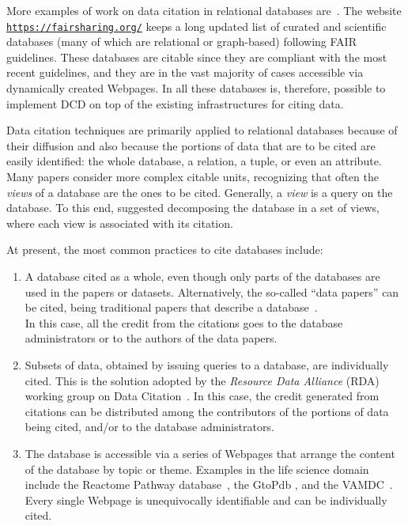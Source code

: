 More examples of work on data citation in relational databases are~\citep{bunemann2016citation, WuSIGMOD18, AlawiniDHW17,davidson2017model}. 
The website \texttt{\url{https://fairsharing.org/}} keeps a long updated list of curated and scientific databases (many of which are relational or graph-based) following FAIR guidelines. These databases are citable since they are compliant with the most recent guidelines, and they are in the vast majority of cases accessible via dynamically created Webpages. 
In all these databases is, therefore, possible to implement DCD on top of the existing infrastructures for citing data.

Data citation techniques are primarily applied to relational databases because of their diffusion and also because the portions of data that are to be cited are easily identified: the whole database, a relation, a tuple, or even an attribute. 
Many papers \citep{buneman2006cite, bunemann2016citation, AlawiniDHW17} consider more complex citable units, recognizing that often the \emph{views} of a database are the ones to be cited. Generally, a \emph{view} is a query on the database.
To this end, \citep{WuSIGMOD18} suggested decomposing the database in a set of views, where each view is associated with its citation. 


At present, the most common practices to cite databases include:
\begin{enumerate}
    \item A database cited as a whole, even though only parts of the databases are used in the papers or datasets. Alternatively, the so-called ``data papers'' can be cited, being traditional papers that describe a database~\citep{CandelaEtAl2015}. \\
    In this case, all the credit from the citations goes to the database administrators or to the authors of the data papers. 
    \item Subsets of data, obtained by issuing queries to a database, are individually cited. This is the solution adopted by the \emph{Resource Data Alliance} (RDA) working group on Data Citation~\citep{RauberEtAl2016}.
    In this case, the credit generated from citations can be distributed among the contributors of the portions of data being cited, and/or to the database administrators. 
    \item The database is accessible via a series of Webpages that arrange the content of the database by topic or theme. Examples in the life science domain include the Reactome Pathway database~\citep{reactome2016}, the GtoPdb \citep{iuphar2018}, and the VAMDC~\citep{ZwolfEtAl2016}.
     Every single Webpage is unequivocally identifiable and can be individually cited. 
\end{enumerate}

